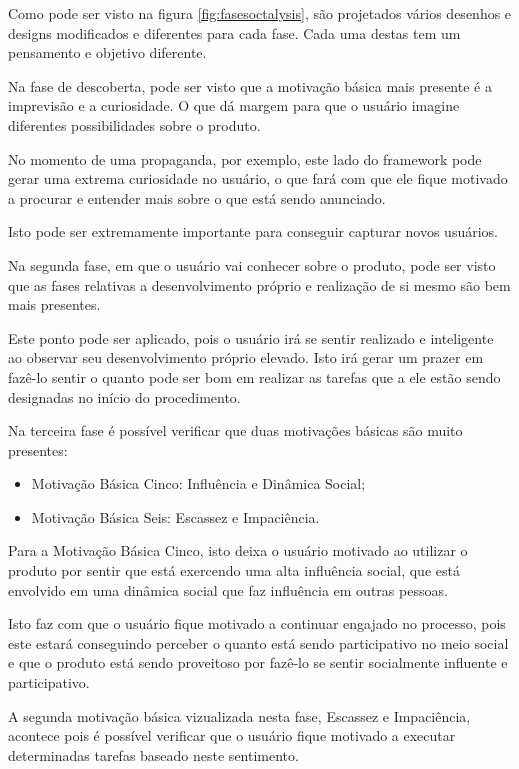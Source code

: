 Como pode ser visto na figura \ref{fig:fasesoctalysis}, são projetados vários
desenhos e designs modificados e diferentes para cada fase. Cada uma destas
tem um pensamento e objetivo diferente.

Na fase de descoberta, pode ser visto que a motivação básica mais presente é
a imprevisão e a curiosidade. O que dá margem para que o usuário imagine diferentes
possibilidades sobre o produto.

No momento de uma propaganda, por exemplo, este lado do framework pode gerar uma
extrema curiosidade no usuário, o que fará com que ele fique motivado a procurar
e entender mais sobre o que está sendo anunciado.

Isto pode ser extremamente importante para conseguir capturar novos usuários.

Na segunda fase, em que o usuário vai conhecer sobre o produto, pode ser visto
que as fases relativas a desenvolvimento próprio e realização de si mesmo
são bem mais presentes.

Este ponto pode ser aplicado, pois o usuário irá se sentir realizado e inteligente
ao observar seu desenvolvimento próprio elevado. Isto irá gerar um prazer em fazê-lo
sentir o quanto pode ser bom em realizar as tarefas que a ele estão sendo designadas
no início do procedimento.

Na terceira fase é possível verificar que duas motivações básicas são muito presentes:

\begin{itemize}
    \item Motivação Básica Cinco: Influência e Dinâmica Social;
    \item Motivação Básica Seis: Escassez e Impaciência.
\end{itemize}


Para a Motivação Básica Cinco, isto deixa o usuário motivado ao utilizar o produto
por sentir que está exercendo uma alta influência social, que está envolvido em
uma dinâmica social que faz influência em outras pessoas.

Isto faz com que o usuário fique motivado a continuar engajado no processo, pois
este estará conseguindo perceber o quanto está sendo participativo no meio social
e que o produto está sendo proveitoso por fazê-lo se sentir socialmente influente
e participativo.


A segunda motivação básica vizualizada nesta fase, Escassez e Impaciência, acontece
pois é possível verificar que o usuário fique motivado a executar determinadas
tarefas baseado neste sentimento.

